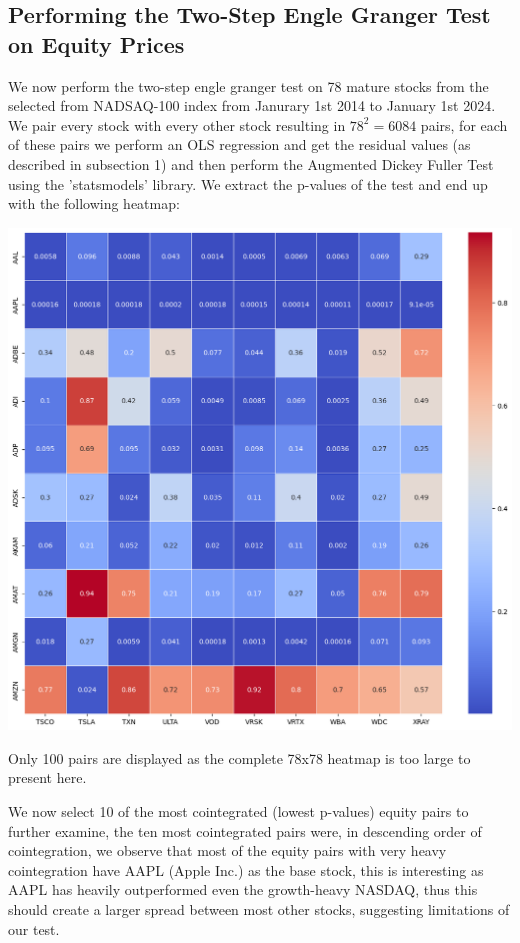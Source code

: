\documentclass{article}
\begin{document}
\begin{spacing}{2.0}
\subsection{Performing the Two-Step Engle Granger Test on Equity Prices}

We now perform the two-step engle granger test on 78 mature stocks from the selected from NADSAQ-100 index from Janurary 1st 2014 to January 1st 2024. We pair every stock with every other
stock resulting in $78^2 = 6084$ pairs, for each of these pairs we perform an OLS regression and get the residual values (as described in subsection 1) and then perform the Augmented Dickey
Fuller Test using the 'statsmodels' library. We extract the p-values of the test and end up with the following heatmap:
\begin{center}
    \includegraphics[scale=0.45]{./images/cointegration.png}
\end{center}
Only 100 pairs are displayed as the complete 78x78 heatmap is too large to present here.

We now select 10 of the most cointegrated (lowest p-values) equity pairs to further examine, the ten most cointegrated pairs were, in descending order of cointegration, we observe
that most of the equity pairs with very heavy cointegration have AAPL (Apple Inc.) as the base stock, this is interesting as AAPL has heavily outperformed even the growth-heavy
NASDAQ, thus this should create a larger spread between most other stocks, suggesting limitations of our test.


\end{spacing}
\end{document}
